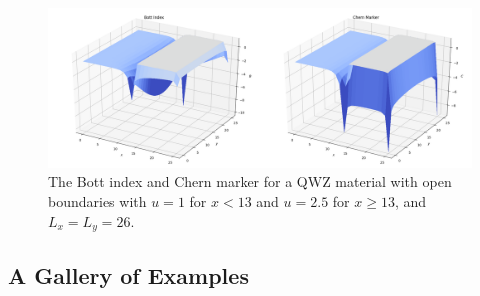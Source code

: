 \begin{figure}[p]
\begin{center}
 \includegraphics[width=\textwidth]{chern_bott_split_open}
\caption{The Bott index and Chern marker for a QWZ material with open boundaries with $u = 1$ for $x<13$ and $u = 2.5$ for  $x\geq13$, and $L_x = L_y = 26$. }
\label{fig:chern_bott_split_open}
\end{center}
\end{figure}
\subsection{A Gallery of Examples}

